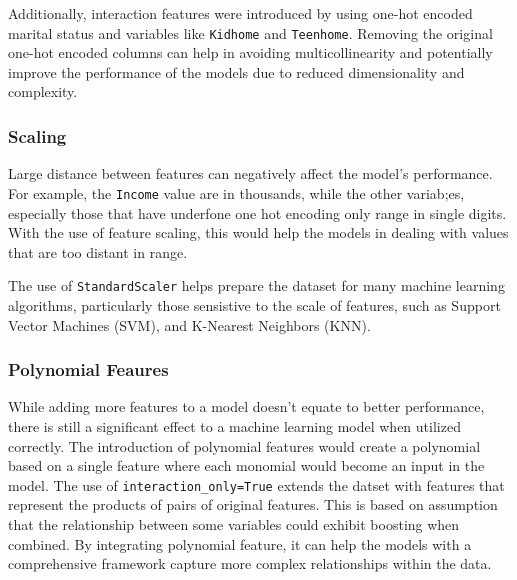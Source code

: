 Additionally, interaction features were introduced by  using one-hot encoded marital status and variables like \texttt{Kidhome} and \texttt{Teenhome}. Removing the original one-hot encoded columns can help in avoiding multicollinearity and potentially improve the performance of the models due to reduced dimensionality and complexity.

\subsubsection{Scaling}

Large distance between features can negatively affect the model's performance. For example, the \texttt{Income} value are in thousands, while the other variab;es, especially those that have underfone one hot encoding only range in single digits. With the use of feature scaling, this would help the models in dealing with values that are too distant in range.

The use of \texttt{StandardScaler} helps prepare the dataset for many machine learning algorithms, particularly those sensistive to the scale of features, such as Support Vector Machines (SVM), and K-Nearest Neighbors (KNN). 

\subsubsection{Polynomial Feaures}

While adding more features to a model doesn't equate to better performance, there is still a significant effect to a machine learning model when utilized correctly. The introduction of polynomial features would create a polynomial based on a single feature where each monomial would become an input in the model. The use of \texttt{interaction\_only=True} extends the datset with features that represent the products of pairs of original features. This is based on assumption that the relationship between some variables could exhibit boosting when combined. By integrating polynomial feature, it can help the models with a comprehensive framework capture more complex relationships within the data.

